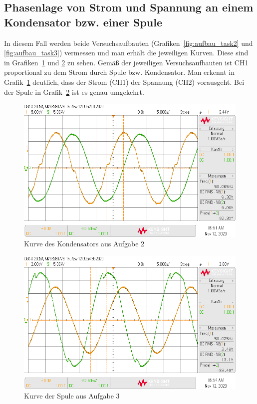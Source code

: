 \documentclass{article}
\begin{document}
\subsection{Phasenlage von Strom und Spannung an einem Kondensator bzw. einer Spule}

In diesem Fall werden beide Versuchsaufbauten (Grafiken~\ref{fig:aufbau_task2} und \ref{fig:aufbau_task3}) vermessen und man erhält die jeweiligen Kurven. Diese sind in Grafiken~\ref{fig:task2_kurve} und \ref{fig:task3_kurve} zu sehen. Gemäß der jeweiligen Versuchsaufbauten ist CH1 proportional zu dem Strom durch Spule bzw. Kondensator. Man erkennt in Grafik~\ref{fig:task2_kurve} deutlich, dass der Strom (CH1) der Spannung (CH2) vorausgeht. Bei der Spule in Grafik~\ref{fig:task3_kurve} ist es genau umgekehrt.

\begin{figure}[H]
\centering
\caption{Kurve des Kondensators aus Aufgabe 2}
\label{fig:task2_kurve}
\includegraphics[scale=0.4]{daten/pul_4.png}
\end{figure}

\begin{figure}[H]
\centering
\caption{Kurve der Spule aus Aufgabe 3}
\label{fig:task3_kurve}
\includegraphics[scale=0.4]{daten/pul_5.png}
\end{figure}
\end{document}
